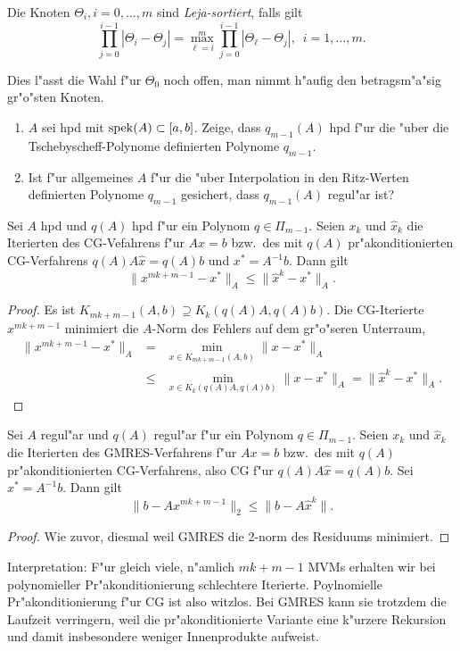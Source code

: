 \begin{defn} Die Knoten $\Theta_i, i=0,\ldots,m$ sind {\em Leja-sortiert}, falls gilt
\[
\prod_{j=0}^{i-1} | \Theta_i - \Theta_j| = \max_{\ell = i}^m  \prod_{j=0}^{i-1} | \Theta_\ell - \Theta_j|, \enspace i=1,\ldots,m.
\]
\end{defn}

Dies l"asst die Wahl f"ur $\Theta_0$ noch offen, man nimmt h"aufig den betragsm"a"sig gr"o"sten Knoten.

\begin{aufg}
\begin{enumerate}
\item $A$ sei hpd mit $\operatorname{spek}(A) \subset [a,b]$.  Zeige, dass $q_{m-1}(A)$ hpd f"ur die "uber die Tschebyscheff-Polynome definierten Polynome $q_{m-1}$.
\item Ist f"ur allgemeines $A$ f"ur die "uber Interpolation in den Ritz-Werten definierten Polynome $q_{m-1}$ gesichert, dass $q_{m-1}(A)$ regul"ar ist?
\end{enumerate}
\end{aufg}

\begin{sa} Sei $A$ hpd und $q(A)$ hpd f"ur ein Polynom $q \in \Pi_{m-1}$. Seien $x_k$ und $\hat x_k$ die Iterierten des CG-Vefahrens f"ur $Ax = b$ bzw.\ des mit $q(A)$ pr"akonditionierten CG-Verfahrens $q(A)A \hat x = q(A)b$ und $x^* = A^{-1}b$.  Dann gilt
\[
\| x^{mk+m-1}-x^*\|_A \leq \| \hat x^k - x^*\|_A.
\]
\end{sa}
\begin{proof} Es ist $K_{mk+m-1}(A,b) \supseteq K_{k}(q(A)A,q(A)b)$. Die CG-Iterierte $x^{mk+m-1}$ minimiert die $A$-Norm des Fehlers auf dem gr"o"seren Unterraum,
\begin{eqnarray*}
\| x^{mk+m-1}-x^*\|_A &=& \min_{x \in K_{mk+m-1}(A,b)} \|x-x^*\|_A \\
&\leq&  \min_{x \in K_{k}(q(A)A,q(A)b)} \|x-x^*\|_A = \| \hat x^k-x^*\|_A.
\end{eqnarray*}

\end{proof}

\begin{sa} Sei $A$ regul"ar und $q(A)$ regul"ar f"ur ein Polynom $q \in \Pi_{m-1}$. Seien $x_k$ und $\hat x_k$ die Iterierten des GMRES-Verfahrens f"ur $Ax = b$ bzw.\ des mit $q(A)$ pr"akonditionierten CG-Verfahrens, also CG f"ur  $q(A)A \hat x = q(A)b$. Sei $x^* = A^{-1}b$.  Dann gilt
\[
\| b - Ax^{mk+m-1}\|_2 \leq \| b - A \hat x^k \|.
\]
\end{sa}
\begin{proof} Wie zuvor, diesmal weil GMRES die 2-norm des Residuums minimiert.
\end{proof}

Interpretation: F"ur gleich viele, n"amlich $mk+m-1$ MVMs erhalten wir bei polynomieller Pr"akonditionierung schlechtere Iterierte. Poylnomielle Pr"akonditionierung f"ur CG ist also witzlos. Bei GMRES kann sie trotzdem die Laufzeit verringern, weil die pr"akonditionierte Variante eine k"urzere Rekursion und damit insbesondere weniger Innenprodukte aufweist.



